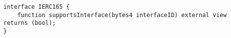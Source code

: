 \begin{lstlisting}[language=Solidity]
interface IERC165 {
	function supportsInterface(bytes4 interfaceID) external view returns (bool);
}
\end{lstlisting}